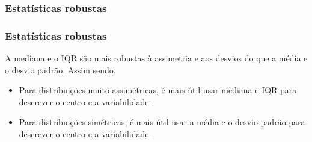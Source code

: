 \begin{frame}
\frametitle{Estatísticas robustas}

\begin{center}
\end{center}


\end{frame}


\begin{frame}
\frametitle{Estatísticas robustas}
\justifying
A mediana e o IQR são mais robustas à assimetria e aos desvios do que a média e o desvio padrão. Assim sendo,

\begin{itemize}
\justifying
\item Para distribuições muito assimétricas, é mais útil usar mediana e IQR para descrever o centro e a variabilidade.
\justifying
\item Para distribuições simétricas, é mais útil usar a média e o desvio-padrão para descrever o centro e a variabilidade.
\end{itemize}

$\:$ \\

\pause
\justifying
{}


\end{frame}


